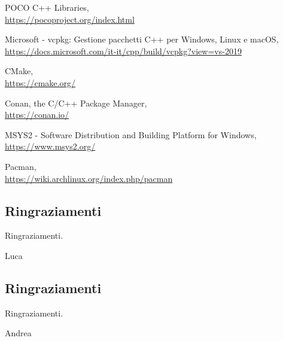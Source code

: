 \documentclass[a4paper,12pt,oneside]{book}
\begin{document}
\begin{thebibliography}{26}
\begin{spacing}{1.25}
	POCO C++ Libraries,
	\\\url{https://pocoproject.org/index.html}
	
	Microsoft - vcpkg: Gestione pacchetti C++ per Windows, Linux e macOS,
	\\\url{https://docs.microsoft.com/it-it/cpp/build/vcpkg?view=vs-2019}
	
	CMake,
	\\\url{https://cmake.org/}
	
	Conan, the C/C++ Package Manager,
	\\\url{https://conan.io/}
	
	MSYS2 - Software Distribution and Building Platform for Windows,
	\\\url{https://www.msys2.org/}
	
	Pacman,
	\\\url{https://wiki.archlinux.org/index.php/pacman}
	\end{spacing}
\end{thebibliography}
\newpage
\null{}
\begin{center}
	\section*{\centering Ringraziamenti}
		Ringraziamenti.
\end{center}

\begin{flushright}
	Luca
\end{flushright}
\null

\newpage
\null{}
\begin{center}
	\section*{\centering Ringraziamenti}
	Ringraziamenti.
\end{center}

\begin{flushright}
	Andrea
\end{flushright}
\null
\end{document}
